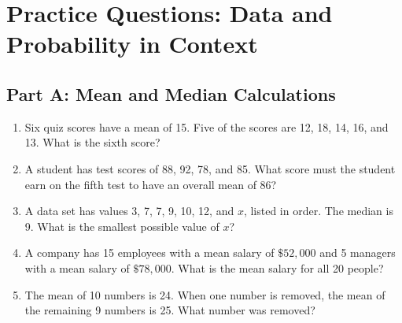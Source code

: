 \documentclass[14pt]{extarticle}
\begin{document}
\newpage

\section*{Practice Questions: Data and Probability in Context}

\subsection*{Part A: Mean and Median Calculations}
\begin{enumerate}
  \item Six quiz scores have a mean of 15. Five of the scores are 12, 18, 14, 16, and 13. What is the sixth score?
  \item A student has test scores of 88, 92, 78, and 85. What score must the student earn on the fifth test to have an overall mean of 86?
  \item A data set has values 3, 7, 7, 9, 10, 12, and \(x\), listed in order. The median is 9. What is the smallest possible value of \(x\)?
  \item A company has 15 employees with a mean salary of \(\$52{,}000\) and 5 managers with a mean salary of \(\$78{,}000\). What is the mean salary for all 20 people?
  \item The mean of 10 numbers is 24. When one number is removed, the mean of the remaining 9 numbers is 25. What number was removed?
\end{enumerate}
\end{document}
